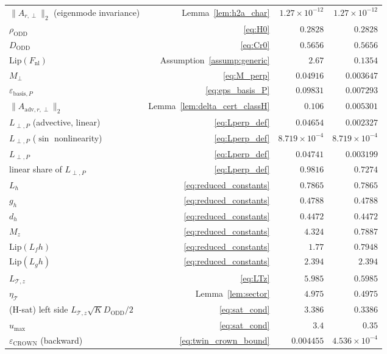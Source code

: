\begin{table}[t]
\begin{tabular}{lrrr}
$\|A_{r,\perp}\|_2$ (eigenmode invariance) & Lemma~\ref{lem:h2a_char} & $1.27\times10^{-12}$ & $1.27\times10^{-12}$ \\
$\rho_{\mathrm{ODD}}$ & \eqref{eq:H0} & $0.2828$ & $0.2828$ \\
$D_{\mathrm{ODD}}$ & \eqref{eq:Cr0} & $0.5656$ & $0.5656$ \\
$\mathrm{Lip}(F_{\mathrm{nl}})$ & Assumption~\ref{assump:generic} & $2.67$ & $0.1354$ \\
$M_\perp$ & \eqref{eq:M_perp} & $0.04916$ & $0.003647$ \\
$\varepsilon_{\mathrm{basis},P}$ & \eqref{eq:eps_basis_P} & $0.09831$ & $0.007293$ \\
$\|A_{\mathrm{adv},r,\perp}\|_2$ & Lemma~\ref{lem:delta_cert_classH} & $0.106$ & $0.005301$ \\
$L_{\perp,P}$ (advective, linear) & \eqref{eq:Lperp_def} & $0.04654$ & $0.002327$ \\
$L_{\perp,P}$ ($\sin$ nonlinearity) & \eqref{eq:Lperp_def} & $8.719\times10^{-4}$ & $8.719\times10^{-4}$ \\
$L_{\perp,P}$ & \eqref{eq:Lperp_def} & $0.04741$ & $0.003199$ \\
linear share of $L_{\perp,P}$ & \eqref{eq:Lperp_def} & $0.9816$ & $0.7274$ \\
$L_h$ & \eqref{eq:reduced_constants} & $0.7865$ & $0.7865$ \\
$g_h$ & \eqref{eq:reduced_constants} & $0.4788$ & $0.4788$ \\
$d_h$ & \eqref{eq:reduced_constants} & $0.4472$ & $0.4472$ \\
$M_z$ & \eqref{eq:reduced_constants} & $4.324$ & $0.7887$ \\
$\mathrm{Lip}(L_fh)$ & \eqref{eq:reduced_constants} & $1.77$ & $0.7948$ \\
$\mathrm{Lip}(L_gh)$ & \eqref{eq:reduced_constants} & $2.394$ & $2.394$ \\
$L_{\mathcal{T},z}$ & \eqref{eq:LTz} & $5.985$ & $0.5985$ \\
$\eta_{\mathcal{T}}$ & Lemma~\ref{lem:sector} & $4.975$ & $0.4975$ \\
(H-sat) left side $L_{\mathcal{T},z}\sqrt{K}D_{\mathrm{ODD}}/2$ & \eqref{eq:sat_cond} & $3.386$ & $0.3386$ \\
$u_{\max}$ & \eqref{eq:sat_cond} & $3.4$ & $0.35$ \\
$\varepsilon_{\mathrm{CROWN}}$ (backward) & \eqref{eq:twin_crown_bound} & $0.004455$ & $4.536\times10^{-4}$ \\
\bottomrule
\end{tabular}
\end{table}
